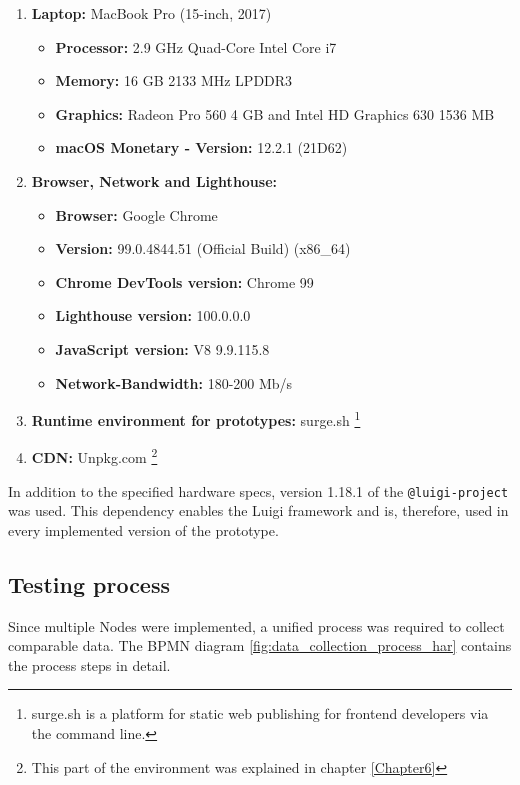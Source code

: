 \begin{enumerate}
	\item \textbf{Laptop:} MacBook Pro (15-inch, 2017)
	\begin{itemize}[noitemsep]
		\item \textbf{Processor:} 2.9 GHz Quad-Core Intel Core i7
		\item \textbf{Memory:} 16 GB 2133 MHz LPDDR3 
		\item \textbf{Graphics:} Radeon Pro 560 4 GB and Intel HD Graphics 630 1536 MB
		\item \textbf{macOS Monetary - Version:} 12.2.1 (21D62)
	\end{itemize} 
	
	\item \textbf{Browser, Network and Lighthouse:}
	\begin{itemize}[noitemsep]
		\item \textbf{Browser:} Google Chrome
		\item \textbf{Version:} 99.0.4844.51 (Official Build) (x86\_64)
		\item \textbf{Chrome DevTools version:} Chrome 99
		\item \textbf{Lighthouse version:} 100.0.0.0
		\item \textbf{JavaScript version:} V8 9.9.115.8
		\item \textbf{Network-Bandwidth:} 180-200 Mb/s
	\end{itemize}
	
	\item \textbf{Runtime environment for prototypes:} surge.sh \footnote{surge.sh is a platform for static web publishing
		for frontend developers via the command line.}
	
	\item \textbf{CDN:} Unpkg.com \footnote{This part of the environment was explained in chapter \ref{Chapter6}}
\end{enumerate}

In addition to the specified hardware specs, version 1.18.1 of the \texttt{@luigi-project} was used. This dependency enables the Luigi framework and is, therefore, used in every implemented version of the prototype.

\subsection{Testing process}

Since multiple Nodes were implemented, a unified process was required to collect comparable data. The BPMN diagram \ref{fig:data_collection_process_har} contains the process steps in detail.

